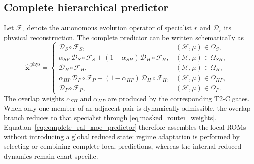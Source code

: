 \subsection{Complete hierarchical predictor}
\label{subsec:complete_hierarchical_predictor}

Let $\mathcal{F}_r$ denote the autonomous evolution operator of specialist
$r$ and $\mathcal{D}_r$ its physical reconstruction.  The complete predictor
can be written schematically as
\begin{equation}
  \widehat{\boldsymbol{x}}^{\,\mathrm{phys}}
  =
  \begin{cases}
    \mathcal{D}_{S}\!\circ\mathcal{F}_{S},
    & (\mathcal{H},\mu)\in\Omega_S,\\[1mm]
    \alpha_{SH}\,\mathcal{D}_{S}\!\circ\mathcal{F}_{S}
    +(1-\alpha_{SH})\,\mathcal{D}_{H}\!\circ\mathcal{F}_{H},
    & (\mathcal{H},\mu)\in\Omega_{SH},\\[1mm]
    \mathcal{D}_{H}\!\circ\mathcal{F}_{H},
    & (\mathcal{H},\mu)\in\Omega_H,\\[1mm]
    \alpha_{HP}\,\mathcal{D}_{P}\!\circ\mathcal{F}_{P}
    +(1-\alpha_{HP})\,\mathcal{D}_{H}\!\circ\mathcal{F}_{H},
    & (\mathcal{H},\mu)\in\Omega_{HP},\\[1mm]
    \mathcal{D}_{P}\!\circ\mathcal{F}_{P},
    & (\mathcal{H},\mu)\in\Omega_P.
  \end{cases}
  \label{eq:complete_ral_moe_predictor}
\end{equation}
The overlap weights $\alpha_{SH}$ and $\alpha_{HP}$ are produced by the
corresponding T2-C gates.  When only one member of an adjacent pair is
dynamically admissible, the overlap branch reduces to that specialist through
\eqref{eq:masked_router_weights}.  Equation~\eqref{eq:complete_ral_moe_predictor}
therefore assembles the local ROMs without introducing a global reduced state:
regime adaptation is performed by selecting or combining complete local
predictions, whereas the internal reduced dynamics remain chart-specific.
